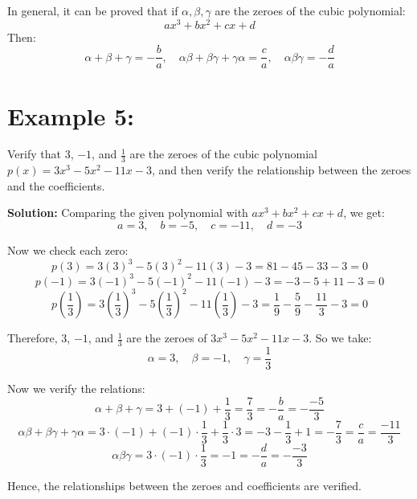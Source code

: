 \documentclass[12pt,twoside]{article}
\newcommand{\solution}{\noindent \textbf{\textcolor{customblue}{Solution:} }}
\begin{document}
\noindent In general, it can be proved that if $\alpha, \beta, \gamma$ are the zeroes of the cubic polynomial:
\[ax^3 + bx^2 + cx + d\]
Then:
\[\alpha + \beta + \gamma = -\frac{b}{a}, \quad \alpha\beta + \beta\gamma + \gamma\alpha = \frac{c}{a}, \quad \alpha\beta\gamma = -\frac{d}{a}\]

\section*{\textcolor{customblue}{Example 5:}}

Verify that $3$, $-1$, and $\frac{1}{3}$ are the zeroes of the cubic polynomial $p(x) = 3x^3 - 5x^2 - 11x - 3$, and then verify the relationship between the zeroes and the coefficients.

\solution Comparing the given polynomial with $ax^3 + bx^2 + cx + d$, we get:
\[a = 3,\quad b = -5,\quad c = -11,\quad d = -3\]

Now we check each zero:
\[p(3) = 3(3)^3 - 5(3)^2 - 11(3) - 3 = 81 - 45 - 33 - 3 = 0\]
\[p(-1) = 3(-1)^3 - 5(-1)^2 - 11(-1) - 3 = -3 - 5 + 11 - 3 = 0\]
\[p\left(\frac{1}{3}\right) = 3\left(\frac{1}{3}\right)^3 - 5\left(\frac{1}{3}\right)^2 - 11\left(\frac{1}{3}\right) - 3 = \frac{1}{9} - \frac{5}{9} - \frac{11}{3} - 3 = 0\]

Therefore, $3$, $-1$, and $\frac{1}{3}$ are the zeroes of $3x^3 - 5x^2 - 11x - 3$. So we take:
\[\alpha = 3, \quad \beta = -1, \quad \gamma = \frac{1}{3}\]

Now we verify the relations:
\[\alpha + \beta + \gamma = 3 + (-1) + \frac{1}{3} = \frac{7}{3} = -\frac{b}{a} = -\frac{-5}{3}\]
\[\alpha\beta + \beta\gamma + \gamma\alpha = 3 \cdot (-1) + (-1) \cdot \frac{1}{3} + \frac{1}{3} \cdot 3 = -3 - \frac{1}{3} + 1 = -\frac{7}{3} = \frac{c}{a} = \frac{-11}{3}\]
\[\alpha\beta\gamma = 3 \cdot (-1) \cdot \frac{1}{3} = -1 = -\frac{d}{a} = -\frac{-3}{3}\]

Hence, the relationships between the zeroes and coefficients are verified.
\end{document}
